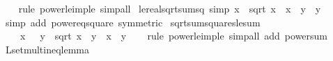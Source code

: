\begin{isabellebody}
%
\isadelimproof
\ \ %
\endisadelimproof
%
\isatagproof
{}\isamarkupfalse%
\ {\isacharparenleft}{\kern0pt}rule\ power{}{\isacharunderscore}{\kern0pt}le{\isacharunderscore}{\kern0pt}imp{\isacharunderscore}{\kern0pt}le{\isacharparenright}{\kern0pt}\ simp{\isacharunderscore}{\kern0pt}all%
\endisatagproof
{\isafoldproof}%
%
\isadelimproof
\isanewline
%
\endisadelimproof
\isanewline
{}\isamarkupfalse%
\ le{\isacharunderscore}{\kern0pt}real{\isacharunderscore}{\kern0pt}sqrt{\isacharunderscore}{\kern0pt}sumsq\ {\isacharbrackleft}{\kern0pt}simp{\isacharbrackright}{\kern0pt}{\isacharcolon}{\kern0pt}\ {\isachardoublequoteopen}x\ {\isasymle}\ sqrt\ {\isacharparenleft}{\kern0pt}x\ {\isacharasterisk}{\kern0pt}\ x\ {\isacharplus}{\kern0pt}\ y\ {\isacharasterisk}{\kern0pt}\ y{\isacharparenright}{\kern0pt}{\isachardoublequoteclose}\isanewline
%
\isadelimproof
\ \ %
\endisadelimproof
%
\isatagproof
{}\isamarkupfalse%
\ {\isacharparenleft}{\kern0pt}simp\ add{\isacharcolon}{\kern0pt}\ power{}{\isacharunderscore}{\kern0pt}eq{\isacharunderscore}{\kern0pt}square\ {\isacharbrackleft}{\kern0pt}symmetric{\isacharbrackright}{\kern0pt}{\isacharparenright}{\kern0pt}%
\endisatagproof
{\isafoldproof}%
%
\isadelimproof
\isanewline
%
\endisadelimproof
\isanewline
{}\isamarkupfalse%
\ sqrt{\isacharunderscore}{\kern0pt}sum{\isacharunderscore}{\kern0pt}squares{\isacharunderscore}{\kern0pt}le{\isacharunderscore}{\kern0pt}sum{\isacharcolon}{\kern0pt}\isanewline
\ \ {\isachardoublequoteopen}{\isasymlbrakk}{}\ {\isasymle}\ x{\isacharsemicolon}{\kern0pt}\ {}\ {\isasymle}\ y{\isasymrbrakk}\ {\isasymLongrightarrow}\ sqrt\ {\isacharparenleft}{\kern0pt}x\ {\isacharplus}{\kern0pt}\ y\ {\isasymle}\ x\ {\isacharplus}{\kern0pt}\ y{\isachardoublequoteclose}\isanewline
%
\isadelimproof
\ \ %
\endisadelimproof
%
\isatagproof
{}\isamarkupfalse%
\ {\isacharparenleft}{\kern0pt}rule\ power{}{\isacharunderscore}{\kern0pt}le{\isacharunderscore}{\kern0pt}imp{\isacharunderscore}{\kern0pt}le{\isacharparenright}{\kern0pt}\ {\isacharparenleft}{\kern0pt}simp{\isacharunderscore}{\kern0pt}all\ add{\isacharcolon}{\kern0pt}\ power{}{\isacharunderscore}{\kern0pt}sum{\isacharparenright}{\kern0pt}%
\endisatagproof
{\isafoldproof}%
%
\isadelimproof
\isanewline
%
\endisadelimproof
\isanewline
{}\isamarkupfalse%
\ L{}{\isacharunderscore}{\kern0pt}set{\isacharunderscore}{\kern0pt}mult{\isacharunderscore}{\kern0pt}ineq{\isacharunderscore}{\kern0pt}lemma{\isacharcolon}{\kern0pt}\isanewline

\end{isabellebody}
